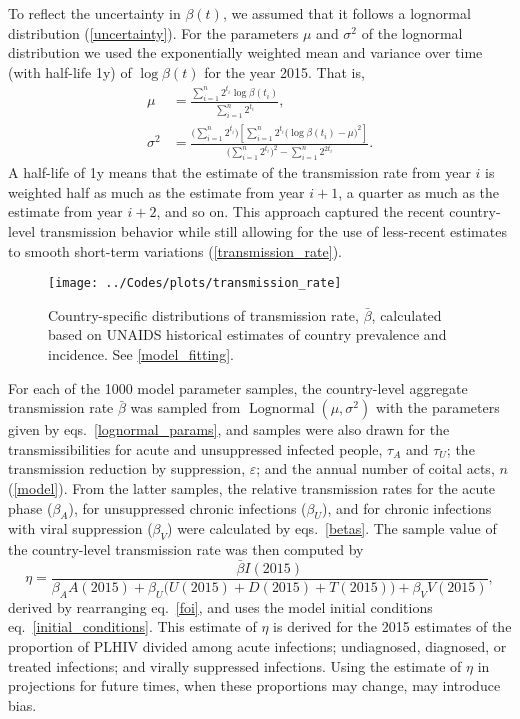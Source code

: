 \documentclass{article}
\DeclareMathOperator{\Lognormal}{Lognormal}
\begin{document}
To reflect the uncertainty in $\beta(t)$, we assumed that it follows a
lognormal distribution (\autoref{uncertainty}). For the parameters
$\mu$ and $\sigma^2$ of the lognormal distribution we used the
exponentially weighted mean and variance\cite{holt2004} over time
(with half-life 1\;y) of $\log \beta(t)$ for the year 2015.  That is,
\begin{equation}
  \label{lognormal_params}
  \begin{split}
    \mu &= \frac{\sum_{i = 1}^n  2^{t_i}
      \log \beta(t_i)}
    {\sum_{i = 1}^n 2^{t_i}},
    \\
    \sigma^2 &= \frac{\big(\sum_{i = 1}^n 2^{t_i}\big)
      \left[\sum_{i = 1}^n  2^{t_i}
        \big(\log \beta(t_i) - \mu\big)^2\right]}
    {\big(\sum_{i = 1}^n 2^{t_i}\big)^2
      - \sum_{i = 1}^n 2^{2 t_i}}.
  \end{split}
\end{equation}
A half-life of 1\;y means that the estimate of the transmission rate
from year $i$ is weighted half as much as the estimate from year
$i + 1$, a quarter as much as the estimate from year $i + 2$, and so
on.  This approach captured the recent country-level transmission
behavior while still allowing for the use of less-recent estimates to
smooth short-term variations (\autoref{transmission_rate}).

\begin{figure}
  \centering
  \texttt{[image: ../Codes/plots/transmission\_rate]}
  \caption{Country-specific distributions of transmission rate,
    $\bar{\beta}$, calculated based on UNAIDS historical estimates of
    country prevalence and incidence.  See \autoref{model_fitting}.}
  \label{transmission_rate}
\end{figure}

For each of the 1000 model parameter samples, the country-level
aggregate transmission rate $\bar{\beta}$ was sampled from
$\Lognormal(\mu, \sigma^2)$ with the parameters given by
eqs.~\eqref{lognormal_params}, and samples were also drawn for the
transmissibilities for acute and unsuppressed infected people,
$\tau_A$ and $\tau_U$; the transmission reduction by suppression,
$\varepsilon$; and the annual number of coital acts, $n$
(\autoref{model}).  From the latter samples, the relative transmission
rates for the acute phase ($\beta_A$), for unsuppressed chronic
infections ($\beta_U$), and for chronic infections with viral
suppression ($\beta_V$) were calculated by eqs.~\eqref{betas}.  The
sample value of the country-level transmission rate was then computed
by
\begin{equation}
  \label{eta}
  \eta = \frac{\bar{\beta} I(2015)}{
    \beta_A A(2015) + \beta_U \big(U(2015) + D(2015) + T(2015)\big)
    + \beta_V V(2015)},
\end{equation}
derived by rearranging eq.~\eqref{foi}, and uses the model initial
conditions eq.~\eqref{initial_conditions}.  This estimate of $\eta$ is
derived for the 2015 estimates of the proportion of PLHIV divided
among acute infections; undiagnosed, diagnosed, or treated infections;
and virally suppressed infections.  Using the estimate of $\eta$ in
projections for future times, when these proportions may change, may
introduce bias.
\end{document}
